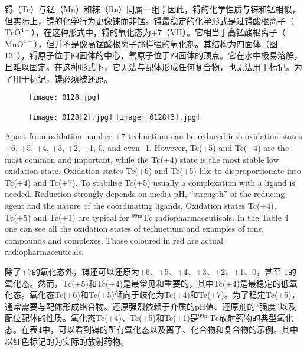 \documentclass[dvipsnames, svgnames,a4paper,11pt]{article}
\begin{document}
锝（Tc）与锰（Mn）和铼（Re）同属一组；因此，锝的化学性质与铼和锰相似，但实际上，锝的化学行为更像铼而非锰。锝最稳定的化学形式是过锝酸根离子（$\mathrm{TcO^{4-}}$），在这种形式中，锝的氧化态为+7（VII）。它相当于高锰酸根离子（$\mathrm{MnO^{4-}}$），但并不是像高锰酸根离子那样强的氧化剂。其结构为四面体（图131），锝原子位于四面体的中心，氧原子位于四面体的顶点。它在水中极易溶解，且难以固定。在这种形式下，它无法与配体形成任何复合物，也无法用于标记。为了用于标记，锝必须被还原。

\begin{figure}[h]
	\centering
    \texttt{[image: 0128.jpg]}    
     \label{fig130}
\end{figure}

\begin{figure}[h]
	\centering
    \texttt{[image: 0128[2].jpg]}    
    \hspace{0.2in}
    \texttt{[image: 0128[3].jpg]} 
     \label{fig131}
\end{figure}

Apart from oxidation number +7 technetium can be reduced into oxidation states +6,
+5, +4, +3, +2, +1, 0, and even -1. However, Tc(+5) and Tc(+4) are the most
common and important, while the Tc(+4) state is the most stable low oxidation state.
Oxidation states Tc(+6) and Tc(+5) like to disproportionate into Tc(+4) and Tc(+7).
To stabilise Tc(+5) usually a complexation with a ligand is needed. Reduction
strongly depends on media pH, “strength” of the reducing agent and the nature of the
coordinating ligands. Oxidation states Tc(+4), Tc(+5) and Tc(+1) are typical for ${}^\mathrm{99m}\mathrm{Tc}$
radiopharmaceuticals. In the Table 4 one can see all the oxidation states of
technetium and examples of ions, compounds and complexes. Those coloured in red
are actual radiopharmaceuticals.

除了+7的氧化态外，锝还可以还原为+6、+5、+4、+3、+2、+1、0，甚至-1的氧化态。然而，Tc(+5)和Tc(+4)是最常见和重要的，其中Tc(+4)是最稳定的低氧化态。氧化态Tc(+6)和Tc(+5)倾向于歧化为Tc(+4)和Tc(+7)。为了稳定Tc(+5)，通常需要与配体形成络合物。还原强烈依赖于介质的pH值、还原剂的“强度”以及配位配体的性质。氧化态Tc(+4)、Tc(+5)和Tc(+1)是${}^\mathrm{99m}\mathrm{Tc}$放射药物的典型氧化态。在表4中，可以看到锝的所有氧化态以及离子、化合物和复合物的示例。其中以红色标记的为实际的放射药物。
\end{document}
